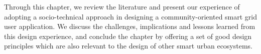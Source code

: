 \begin{svgraybox}
Through this chapter, we review the literature and present our experience of adopting a socio-technical approach in designing a community-oriented smart grid user application. We discuss the challenges, implications and lessons learned from this design experience, and conclude the chapter by offering a set of good design principles which are also relevant to the design of other smart urban ecosystems. 

\end{svgraybox}

